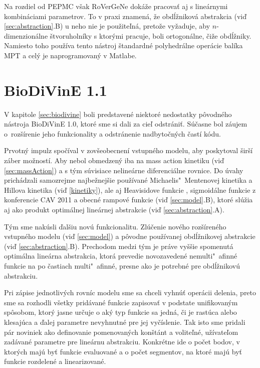 \documentclass[11pt,final,oneside]{fithesis}
\begin{document}
Na rozdiel od PEPMC v\v sak RoVerGeNe dok\'a\v ze pracova\v t aj s line\'arnymi kombin\'aciami parametrov. To v praxi znamen\'a, \v ze obd\'l\v znikov\'a
abstrakcia (vi\v d \ref{sec:abstraction}.B) u neho nie je
pou\v zite\v ln\'a, preto\v ze vy\v zaduje, aby $n$-dimen\-zion\'alne \v stvoruholn\'iky s ktor\'ymi pracuje, boli ortogon\'alne, \v ci\v ze obd\'l\v zniky.
Namiesto toho pou\v z\'iva tento n\'astroj \v standardn\'e polyhedr\'alne oper\'acie bal\'ika MPT \cite{mpt} a cel\'y je naprogramovan\'y v Matlabe.
\cite{rovergene}
\cite{rovergene-site}

\chapter{BioDiVinE 1.1}
V kapitole \ref{sec:biodivine} boli predstaven\'e niektor\'e nedostatky p\^ ovodn\'eho n\'astroja BioDiVinE 1.0, ktor\'e sme si dali za cie\v l odstr\'ani\v t.
S\'u\v casne bol z\'aujem o~roz\v s\'irenie jeho funkcionality a odstr\'anenie nadbyto\v cn\'ych \v cast\'i k\'odu. 

Prvotn\'y impulz spo\v c\'ival v zov\v seobecnen\'i vstupn\'eho modelu, aby poskytoval \v sir\v s\'i z\'aber mo\v znost\'i. Aby nebol obmedzen\'y iba na mass 
action kinetiku (vi\v d \ref{sec:massAction}) a s t\'ym s\'uvisiace neline\'arne diferenci\'alne rovnice. Do \'uvahy prich\'adzali samozrejme najbe\v znej\v sie 
pou\v z\'ivan\'e Michaelis"~Mente\-novej kinetika a Hillova kinetika (vi\v d \ref{kinetiky}), ale aj Heavisidove funkcie \cite{step}, sigmoid\'alne funkcie z
konferencie CAV 2011 \cite{CAV-2011} a obecn\'e rampov\'e funkcie (vi\v d \ref{sec:model}.B), ktor\'e sl\'u\v zia aj ako produkt optim\'alnej line\'arnej abstrakcie (vi\v d 
\ref{sec:abstraction}.A).

T\'ym sme nak\'usli \v dal\v siu nov\'u funkcionalitu. Zl\'u\v cenie nov\'eho roz\v s\'iren\'eho vstupn\'eho modelu (vi\v d \ref{sec:model}) a p\^ ovodne 
pou\v z\'ivanej obd\'l\v znikovej abstrakcie (vi\v d \ref{sec:abstraction}.B). Prechodom medzi t\'ym je pr\'ave vy\v s\v sie spomenut\'a op\-ti\-m\'al\-na 
line\'arna abstrakcia, ktor\'a prevedie novozaveden\'e nemulti"~afin\-n\'e funk\-cie na po \v castiach multi"~afinn\'e, presne ako je potrebn\'e pre 
obd\'l\v znikov\'u abstrakciu.

Pri z\'apise jednotliv\'ych rovn\'ic modelu sme sa chceli vyhn\'u\v t oper\'acii delenia, preto sme sa rozhodli v\v setky prid\'avan\'e funkcie zapisova\v t
v podstate unifikovan\'ym sp\^ osobom, ktor\'y jasne ur\v cuje o ak\'y typ funkcie sa jedn\'a, \v ci je rast\'uca alebo klesaj\'uca a \v dalej parametre 
nevyhnutn\'e pre jej vy\v c\'islenie. Tak isto sme pridali p\'ar noviniek ako definovanie pomenovan\'ych kon\v st\'ant a volite\v ln\'e, u\v z\'ivate\v lom 
zad\'avan\'e parametre pre line\'arnu abstrakciu. Konkr\'etne ide o po\v cet bodov, v ktor\'ych maj\'u by\v t funkcie evaluovan\'e a o po\v cet segmentov, 
na ktor\'e maj\'u by\v t funkcie rozdelen\'e a linearizovan\'e.
\end{document}
